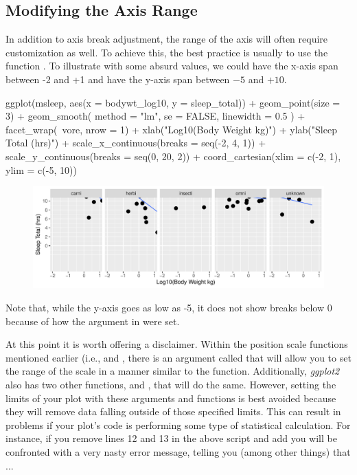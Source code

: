 \subsection{Modifying the Axis Range}

In addition to axis break adjustment, the range of the axis will often require customization as well.  To achieve this, the best practice is usually to use the function .  To illustrate with some absurd values, we could have the x-axis span between -2 and +1 and have the y-axis span between $-5$ and $+10$.

\begin{inR}
ggplot(msleep, aes(x = bodywt_log10, y = sleep_total)) +
  geom_point(size = 3) +
  geom_smooth(
    method = "lm",
    se = FALSE,
    linewidth = 0.5
  ) +
  facet_wrap(~vore, nrow = 1) +
  xlab("Log10(Body Weight kg)") + 
  ylab("Sleep Total (hrs)") +
  scale_x_continuous(breaks = seq(-2, 4, 1)) +
  scale_y_continuous(breaks = seq(0, 20, 2)) +
  coord_cartesian(xlim = c(-2, 1), ylim = c(-5, 10))
\end{inR}

\vspace{2em}

\begin{figure}[H]
\includegraphics[scale = .75]{graphics/ch2Figs/ggEx_19.pdf}
\end{figure}

\noindent
Note that, while the y-axis goes as low as -5, it does not show breaks below 0 because of how the  argument in  were set.

At this point it is worth offering a disclaimer.  Within the position scale functions mentioned earlier (i.e.,  and , there is an argument called  that will allow you to set the range of the scale in a manner similar to the  function. Additionally, \textit{ggplot2} also has two other functions,  and , that will do the same. However, setting the limits of your plot with these arguments and functions is best avoided because they will remove data falling outside of those specified limits. This can result in problems if your plot's code is performing some type of statistical calculation. For instance, if you remove lines 12 and 13 in the above script and add  you will be confronted with a very nasty error message, telling you (among other things) that ...

